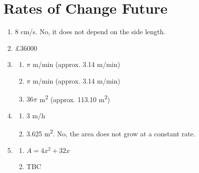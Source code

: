 \documentclass[12pt]{article}
\begin{document}
\section*{Rates of Change Future}
\begin{enumerate}[resume]
    \item 8 cm/s. No, it does not depend on the side length.
    \item £36000
    \item \begin{enumerate}
        \item \(\pi\) m/min (approx. 3.14 m/min)
        \item \(\pi\) m/min (approx. 3.14 m/min)
        \item \(36\pi\) m\textsuperscript{2} (approx. 113.10 m\textsuperscript{2})
    \end{enumerate}
    \item \begin{enumerate}
        \item 3 m/h
        \item 3.625 m\textsuperscript{2}. No, the area does not grow at a constant rate.
    \end{enumerate}
    \item \begin{enumerate}
        \item \(A = 4x^2 + 32x\)
        \item TBC
    \end{enumerate}
\end{enumerate}
\end{document}
